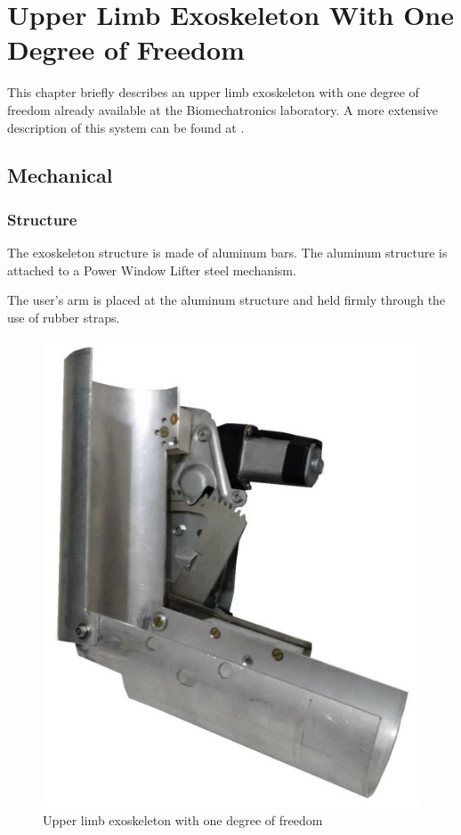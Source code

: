    \chapter{Upper Limb Exoskeleton With One Degree of Freedom}
   
   \label{ch:ulexo}
   
   This chapter briefly describes an upper limb exoskeleton with one degree of freedom already available at the Biomechatronics laboratory. A more extensive description of this system can be found at \cite{Sommer2015}.
   
   \section{Mechanical}
   
   \subsection{Structure}
   
   The exoskeleton structure is made of aluminum bars. The aluminum structure is attached to a Power Window Lifter steel mechanism.
   
   The user's arm is placed at the aluminum structure and held firmly through the use of rubber straps.
   
   \begin{figure}[thpb]
      \centering
      \includegraphics[scale=0.5]{Images/Exoskeleton.jpg}
      \caption{Upper limb exoskeleton with one degree of freedom \cite{Sommer2015}}
      \label{exoskeleton}
   \end{figure}
   
